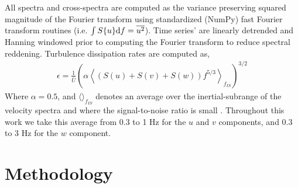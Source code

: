 \documentclass[twocol]{ametsoc}
\begin{document}
All spectra and cross-spectra are computed as the variance preserving squared magnitude of the Fourier transform using standardized (NumPy) fast Fourier transform routines (i.e. $\int S\{u\}\mathrm{d}f = \overline{u^2}$). Time series' are linearly detrended and Hanning windowed prior to computing the Fourier transform to reduce spectral reddening. Turbulence dissipation rates are computed as,
\begin{align}
  \epsilon = \frac{1}{\bar{U}}\left(\alpha\left\langle(S(u)+S(v)+S(w))f^{5/3}\right\rangle_{f_{IS}}\right)^{3/2}
\end{align}
Where  $\alpha=0.5$, and $\langle\rangle_{f_{IS}}$ denotes an average over the inertial-subrange of the velocity spectra and where the signal-to-noise ratio is small \cite[]{Lumley+Terray1983,Sreenivasan1995}. Throughout this work we take this average from 0.3 to 1 Hz for the $u$ and $v$ components, and 0.3 to 3 Hz for the $w$ component.

\section{Methodology}
\label{sec:methods}

\end{document}

